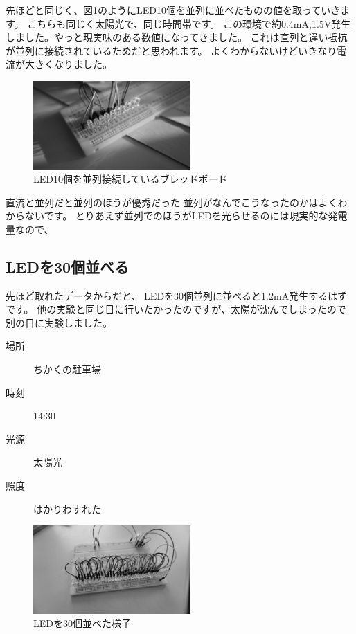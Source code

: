 先ほどと同じく、図\ref{fig:led_par10}のようにLED10個を並列に並べたものの値を取っていきます。
こちらも同じく太陽光で、同じ時間帯です。
この環境で約0.4\si{\milli\ampere},1.5$\si\volt$発生しました。やっと現実味のある数値になってきました。
これは直列と違い抵抗が並列に接続されているためだと思われます。
よくわからないけどいきなり電流が大きくなりました。


\begin{figure}[htbp]
    \centering
    \includegraphics[width=60mm]{./assets/mouse/gray/5.JPG}
    \caption{LED10個を並列接続しているブレッドボード}
    \label{fig:led_par10}
\end{figure}

直流と並列だと並列のほうが優秀だった
並列がなんでこうなったのかはよくわからないです。
とりあえず並列でのほうがLEDを光らせるのには現実的な発電量なので、

\subsection{LEDを30個並べる}

先ほど取れたデータからだと、
LEDを30個並列に並べると1.2\si{\milli\ampere}発生するはずです。
他の実験と同じ日に行いたかったのですが、太陽が沈んでしまったので別の日に実験しました。

\begin{description}
  \item[場所]{ちかくの駐車場}
  \item[時刻]{14:30}
  \item[光源]{太陽光}
  \item[照度]{はかりわすれた}
\end{description}


\begin{figure}[htbp]
    \centering
    \includegraphics[width=60mm]{./assets/mouse/gray/10.JPG}
    \caption{LEDを30個並べた様子}
    \label{fig:led_par30}
\end{figure}

